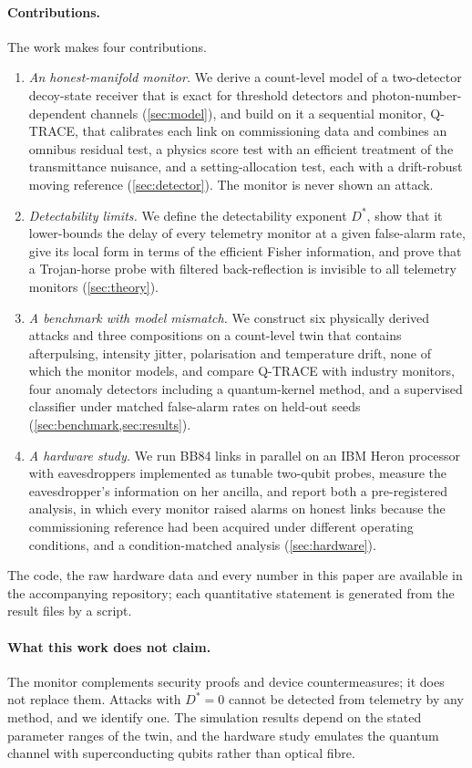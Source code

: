 \documentclass[11pt,a4paper]{article}
\theoremstyle{definition}
\theoremstyle{remark}
\newcommand{\Dstar}{D^{\ast}}
\newcommand{\qtrace}{Q-TRACE}
\begin{document}
\paragraph{Contributions.} The work makes four contributions.
\begin{enumerate}[label=(\roman*)]
\item \emph{An honest-manifold monitor.} We derive a count-level model of a two-detector decoy-state receiver that is exact for threshold detectors and photon-number-dependent channels (\cref{sec:model}), and build on it a sequential monitor, \qtrace{}, that calibrates each link on commissioning data and combines an omnibus residual test, a physics score test with an efficient treatment of the transmittance nuisance, and a setting-allocation test, each with a drift-robust moving reference (\cref{sec:detector}). The monitor is never shown an attack.
\item \emph{Detectability limits.} We define the detectability exponent $\Dstar$, show that it lower-bounds the delay of every telemetry monitor at a given false-alarm rate, give its local form in terms of the efficient Fisher information, and prove that a Trojan-horse probe with filtered back-reflection is invisible to all telemetry monitors (\cref{sec:theory}).
\item \emph{A benchmark with model mismatch.} We construct six physically derived attacks and three compositions on a count-level twin that contains afterpulsing, intensity jitter, polarisation and temperature drift, none of which the monitor models, and compare \qtrace{} with industry monitors, four anomaly detectors including a quantum-kernel method, and a supervised classifier under matched false-alarm rates on held-out seeds (\cref{sec:benchmark,sec:results}).
\item \emph{A hardware study.} We run \HwLinks{} BB84 links in parallel on an IBM Heron processor with eavesdroppers implemented as tunable two-qubit probes, measure the eavesdropper's information on her ancilla, and report both a pre-registered analysis, in which every monitor raised alarms on honest links because the commissioning reference had been acquired under different operating conditions, and a condition-matched analysis (\cref{sec:hardware}).
\end{enumerate}
The code, the raw hardware data and every number in this paper are available in the accompanying repository; each quantitative statement is generated from the result files by a script.

\paragraph{What this work does not claim.} The monitor complements security proofs and device countermeasures; it does not replace them. Attacks with $\Dstar=0$ cannot be detected from telemetry by any method, and we identify one. The simulation results depend on the stated parameter ranges of the twin, and the hardware study emulates the quantum channel with superconducting qubits rather than optical fibre.
\end{document}
